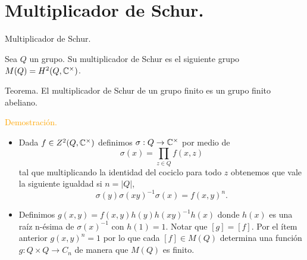 \documentclass[aspectratio=169, 9pt]{beamer}
\begin{document}
\section[Multiplicador de Schur.]{Multiplicador de Schur.}
\begin{frame}[fragile]{Multiplicador de Schur.}

Sea $Q$ un grupo. Su \alert{multiplicador de Schur} es el siguiente grupo $M(Q) = H^2(Q, \Bbb C^\times)$. \pause
{}
\begin{alertblock}{Teorema.}
	El multiplicador de Schur de un grupo finito es un grupo finito abeliano.
\end{alertblock} \pause
\textcolor{orange}{Demostración.}
\begin{itemize}
	\item Dada $f \in Z^2(Q, \Bbb C^\times)$ definimos $\sigma:Q \to \Bbb C^\times$ por medio de
	\begin{equation*}
		\sigma(x) = \prod_{z \in Q} f(x,z)
	\end{equation*} \pause
	tal que multiplicando la identidad del cociclo para todo $z$ obtenemos que vale la siguiente igualdad si $n=|Q|$,
	\begin{equation*}
		\sigma(y)\sigma(xy)^{-1}\sigma(x) = f(x,y)^n.
	\end{equation*} \pause
	\item Definimos $g(x,y)=f(x,y)h(y)h(xy)^{-1}h(x)$ donde $h(x)$ es una raíz n-ésima de $\sigma(x)^{-1}$ con $h(1)=1$. \pause Notar que $[g]=[f]$. Por el ítem anterior $g(x,y)^n=1$ por lo que cada $[f] \in M(Q)$ determina una función $g:Q \times Q \to C_n$ de manera que $M(Q)$ es finito.
\end{itemize}

\end{frame}
\end{document}
